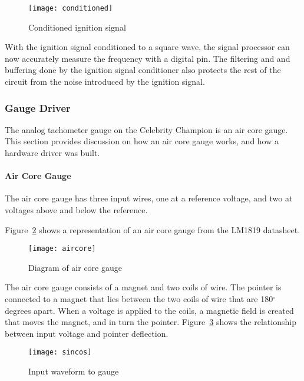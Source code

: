 \begin{figure}[H]
    \centering
    \texttt{[image: conditioned]}
    \caption{Conditioned ignition signal}
    \label{fig:conditioned}
\end{figure}

With the ignition signal conditioned to a square wave, the signal processor can now accurately measure the frequency with a digital pin. The filtering and and buffering done by the ignition signal conditioner also protects the rest of the circuit from the noise introduced by the ignition signal.

\subsubsection{Gauge Driver} %
\label{sec:gauge} %
The analog tachometer gauge on the Celebrity Champion is an air core gauge. This section provides discussion on how an air core gauge works, and how a hardware driver was built.
\paragraph{Air Core Gauge}
The air core gauge has three input wires, one at a reference voltage, and two at voltages above and below the reference.

Figure~\ref{fig:aircore} shows a representation of an air core gauge from the LM1819 datasheet.


\begin{figure}[H]
    \centering
    \texttt{[image: aircore]}
    \caption{Diagram of air core gauge~ \cite{lm1819}}
    \label{fig:aircore}
\end{figure}

The air core gauge consists of a magnet and two coils of wire. The pointer is connected to a magnet that lies between the two coils of wire that are 180$^{\circ}$ degrees apart. When a voltage is applied to the coils, a magnetic field is created that moves the magnet, and in turn the pointer. Figure~\ref{fig:tach} shows the relationship between input voltage and pointer deflection.

\begin{figure}[H]
    \centering
    \texttt{[image: sincos]}
    \caption{Input waveform to gauge}
    \label{fig:tach}
\end{figure}

